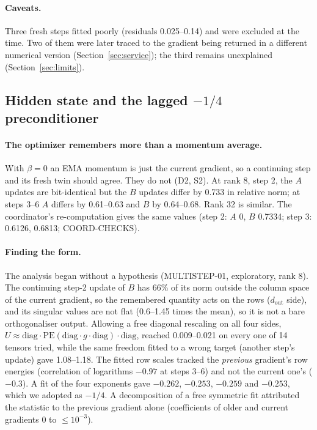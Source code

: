 \documentclass[11pt]{article}
\newcommand{\PE}{\mathrm{PE}}
\newcommand{\diag}{\mathrm{diag}}
\begin{document}
\paragraph{Caveats.} Three fresh steps fitted poorly (residuals 0.025--0.14) and were excluded at the
time. Two of them were later traced to the gradient being returned in a different numerical version
(Section~\ref{sec:service}); the third remains unexplained (Section~\ref{sec:limits}).

\subsection{\texorpdfstring{Hidden state and the lagged $-1/4$ preconditioner}{Hidden state and the lagged -1/4 preconditioner}}\label{sec:ev-state}
\paragraph{The optimizer remembers more than a momentum average.} With $\beta=0$ an EMA momentum is
just the current gradient, so a continuing step and its fresh twin should agree. They do not
(D2, S2). At rank 8, step 2, the $A$ updates are bit-identical but the $B$ updates differ by 0.733
in relative norm; at steps 3--6 $A$ differs by 0.61--0.63 and $B$ by 0.64--0.68. Rank 32 is similar.
The coordinator's re-computation gives the same values (step 2: $A$ 0, $B$ 0.7334; step 3: 0.6126,
0.6813; COORD-CHECKS).

\paragraph{Finding the form.} The analysis began without a hypothesis (MULTISTEP-01, exploratory,
rank 8). The continuing step-2 update of $B$ has 66\% of its norm outside the column space of the
current gradient, so the remembered quantity acts on the rows ($d_\text{out}$ side), and its
singular values are not flat (0.6--1.45 times the mean), so it is not a bare orthogonaliser output.
Allowing a free diagonal rescaling on all four sides, $U\approx\diag\cdot\PE(\diag\cdot g\cdot
\diag)\cdot\diag$, reached 0.009--0.021 on every one of 14 tensors tried, while the same freedom
fitted to a wrong target (another step's update) gave 1.08--1.18. The fitted row scales tracked the
\emph{previous} gradient's row energies (correlation of logarithms $-0.97$ at steps 3--6) and not the
current one's ($-0.3$). A fit of the four exponents gave $-0.262$, $-0.253$, $-0.259$ and $-0.253$,
which we adopted as $-1/4$. A decomposition of a free symmetric fit attributed the statistic to the
previous gradient alone (coefficients of older and current gradients 0 to $\le10^{-3}$).
\end{document}
